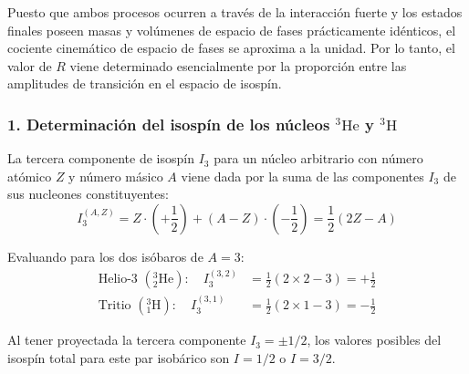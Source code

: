 Puesto que ambos procesos ocurren a través de la interacción fuerte y los estados finales poseen masas y volúmenes de espacio de fases prácticamente idénticos, el cociente cinemático de espacio de fases se aproxima a la unidad. Por lo tanto, el valor de $R$ viene determinado esencialmente por la proporción entre las amplitudes de transición en el espacio de isospín.

\subsubsection*{1. Determinación del isospín de los núcleos ${^3\text{He}}$ y ${^3\text{H}}$}

La tercera componente de isospín $I_3$ para un núcleo arbitrario con número atómico $Z$ y número másico $A$ viene dada por la suma de las componentes $I_3$ de sus nucleones constituyentes:
\begin{equation}
    I_3^{(A,Z)} = Z \cdot \left(+\frac{1}{2}\right) + (A - Z) \cdot \left(-\frac{1}{2}\right) = \frac{1}{2} (2Z - A)
\end{equation}

Evaluando para los dos isóbaros de $A = 3$:
\begin{align}
    \text{Helio-3 } ({^3_2\text{He}}): \quad I_3^{(3,2)} &= \frac{1}{2} (2\times 2 - 3) = +\frac{1}{2} \\
    \text{Tritio } ({^3_1\text{H}}): \quad I_3^{(3,1)} &= \frac{1}{2} (2\times 1 - 3) = -\frac{1}{2}
\end{align}

Al tener proyectada la tercera componente $I_3 = \pm 1/2$, los valores posibles del isospín total para este par isobárico son $I = 1/2$ o $I = 3/2$.


